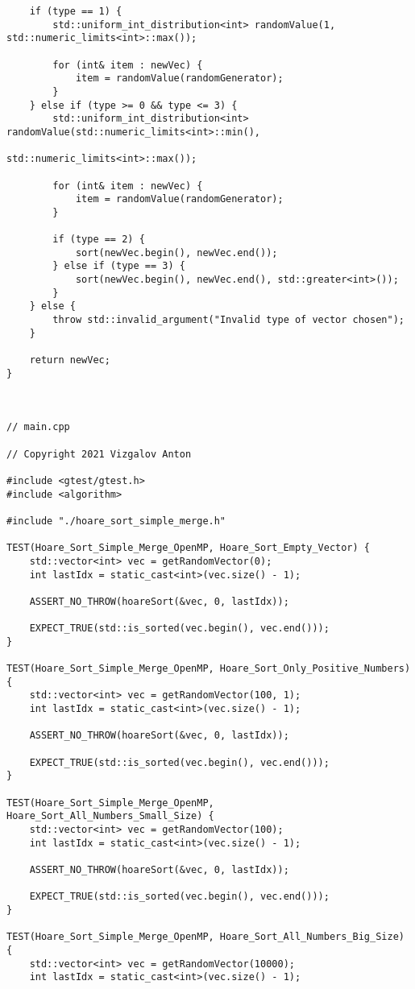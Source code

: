 \documentclass{report}
\begin{document}
\begin{lstlisting}
    if (type == 1) {
        std::uniform_int_distribution<int> randomValue(1, std::numeric_limits<int>::max());

        for (int& item : newVec) {
            item = randomValue(randomGenerator);
        }
    } else if (type >= 0 && type <= 3) {
        std::uniform_int_distribution<int> randomValue(std::numeric_limits<int>::min(),
                                                       std::numeric_limits<int>::max());

        for (int& item : newVec) {
            item = randomValue(randomGenerator);
        }

        if (type == 2) {
            sort(newVec.begin(), newVec.end());
        } else if (type == 3) {
            sort(newVec.begin(), newVec.end(), std::greater<int>());
        }
    } else {
        throw std::invalid_argument("Invalid type of vector chosen");
    }

    return newVec;
}



// main.cpp

// Copyright 2021 Vizgalov Anton

#include <gtest/gtest.h>
#include <algorithm>

#include "./hoare_sort_simple_merge.h"

TEST(Hoare_Sort_Simple_Merge_OpenMP, Hoare_Sort_Empty_Vector) {
    std::vector<int> vec = getRandomVector(0);
    int lastIdx = static_cast<int>(vec.size() - 1);

    ASSERT_NO_THROW(hoareSort(&vec, 0, lastIdx));

    EXPECT_TRUE(std::is_sorted(vec.begin(), vec.end()));
}

TEST(Hoare_Sort_Simple_Merge_OpenMP, Hoare_Sort_Only_Positive_Numbers) {
    std::vector<int> vec = getRandomVector(100, 1);
    int lastIdx = static_cast<int>(vec.size() - 1);

    ASSERT_NO_THROW(hoareSort(&vec, 0, lastIdx));

    EXPECT_TRUE(std::is_sorted(vec.begin(), vec.end()));
}

TEST(Hoare_Sort_Simple_Merge_OpenMP, Hoare_Sort_All_Numbers_Small_Size) {
    std::vector<int> vec = getRandomVector(100);
    int lastIdx = static_cast<int>(vec.size() - 1);

    ASSERT_NO_THROW(hoareSort(&vec, 0, lastIdx));

    EXPECT_TRUE(std::is_sorted(vec.begin(), vec.end()));
}

TEST(Hoare_Sort_Simple_Merge_OpenMP, Hoare_Sort_All_Numbers_Big_Size) {
    std::vector<int> vec = getRandomVector(10000);
    int lastIdx = static_cast<int>(vec.size() - 1);


\end{lstlisting}
\end{document}

